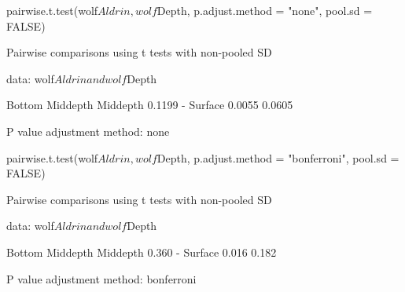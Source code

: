 \documentclass[a4paper]{article}\usepackage[]{graphicx}\usepackage[]{xcolor}
\begin{document}
\begin{Schunk}
\begin{Sinput}
pairwise.t.test(wolf$Aldrin, wolf$Depth, 
                p.adjust.method = "none", pool.sd = FALSE)
\end{Sinput}
\begin{Soutput}

	Pairwise comparisons using t tests with non-pooled SD 

data:  wolf$Aldrin and wolf$Depth 

         Bottom Middepth
Middepth 0.1199 -       
Surface  0.0055 0.0605  

P value adjustment method: none 
\end{Soutput}
\begin{Sinput}
pairwise.t.test(wolf$Aldrin, wolf$Depth,
                p.adjust.method = "bonferroni", pool.sd = FALSE)
\end{Sinput}
\begin{Soutput}

	Pairwise comparisons using t tests with non-pooled SD 

data:  wolf$Aldrin and wolf$Depth 

         Bottom Middepth
Middepth 0.360  -       
Surface  0.016  0.182   

P value adjustment method: bonferroni 
\end{Soutput}
\end{Schunk}
\end{document}
